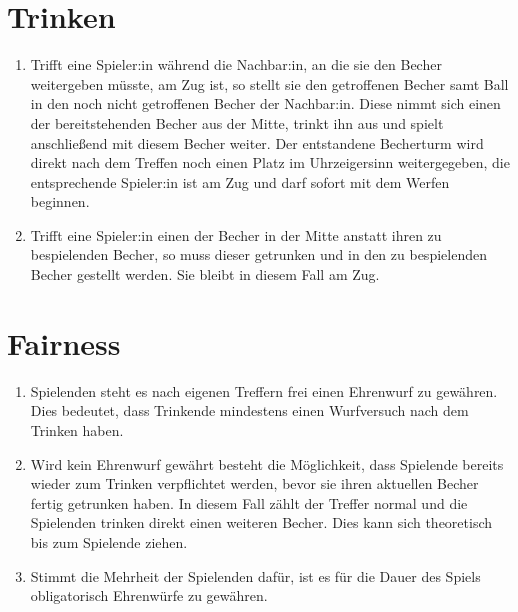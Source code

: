 \section{Trinken}
\begin{enumerate}[label={(\arabic*)}]
    \item
    Trifft eine Spieler:in während die Nachbar:in, an die sie den Becher weitergeben müsste, am Zug ist, so stellt sie den getroffenen Becher samt Ball in den noch nicht getroffenen Becher der Nachbar:in.
    Diese nimmt sich einen der bereitstehenden Becher aus der Mitte, trinkt ihn aus und spielt anschließend mit diesem Becher weiter.
    Der entstandene Becherturm wird direkt nach dem Treffen noch einen Platz im Uhrzeigersinn weitergegeben, die entsprechende Spieler:in ist am Zug und darf sofort mit dem Werfen beginnen.

    \item
    Trifft eine Spieler:in einen der Becher in der Mitte anstatt ihren zu bespielenden Becher, so muss dieser getrunken und in den zu bespielenden Becher gestellt werden.
    Sie bleibt in diesem Fall am Zug.
\end{enumerate}

\section{Fairness}
\begin{enumerate}[label={(\arabic*)}]
    \item
    Spielenden steht es nach eigenen Treffern frei einen \glqq{}Ehrenwurf\grqq{} zu gewähren.
    Dies bedeutet, dass Trinkende mindestens einen Wurfversuch nach dem Trinken haben.

    \item
    Wird kein Ehrenwurf gewährt besteht die Möglichkeit, dass Spielende bereits wieder zum Trinken verpflichtet werden, bevor sie ihren aktuellen Becher fertig getrunken haben.
    In diesem Fall zählt der Treffer normal und die Spielenden trinken direkt einen weiteren Becher.
    Dies kann sich theoretisch bis zum Spielende ziehen.

    \item
    Stimmt die Mehrheit der Spielenden dafür, ist es für die Dauer des Spiels obligatorisch Ehrenwürfe zu gewähren.
\end{enumerate}
